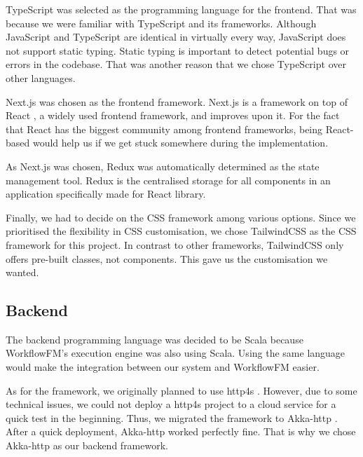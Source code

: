 TypeScript \cite{typescript} was selected as the programming language for the frontend. That was because we were familiar with TypeScript and its frameworks. 
Although JavaScript \cite{javascript} and TypeScript are identical in virtually every way, JavaScript does not support static typing. Static typing is important to detect potential bugs or errors in the codebase. That was another reason that we chose TypeScript over other languages.

Next.js \cite{nextjs} was chosen as the frontend framework. Next.js is a framework on top of React \cite{react}, a widely used frontend framework, and improves upon it. For the fact that React has the biggest community among frontend frameworks, being React-based would help us if we get stuck somewhere during the implementation.


As Next.js was chosen, Redux \cite{redux} was automatically determined as the state management tool. Redux is the centralised storage for all components in an application specifically made for React library.

Finally, we had to decide on the CSS framework among various options. Since we prioritised the flexibility in CSS customisation, we chose TailwindCSS \cite{tailwindcss} as the CSS framework for this project. In contrast to other frameworks, TailwindCSS only offers pre-built classes, not components. This gave us the customisation we wanted.

\subsection{Backend}
The backend programming language was decided to be Scala \cite{scala} because WorkflowFM's execution engine was also using Scala. Using the same language would make the integration between our system and WorkflowFM easier.

As for the framework, we originally planned to use http4s \cite{http4s}. However, due to some technical issues, we could not deploy a http4s project to a cloud service for a quick test in the beginning. Thus, we migrated the framework to Akka-http \cite{akka}. After a quick deployment, Akka-http worked perfectly fine. That is why we chose Akka-http as our backend framework.

